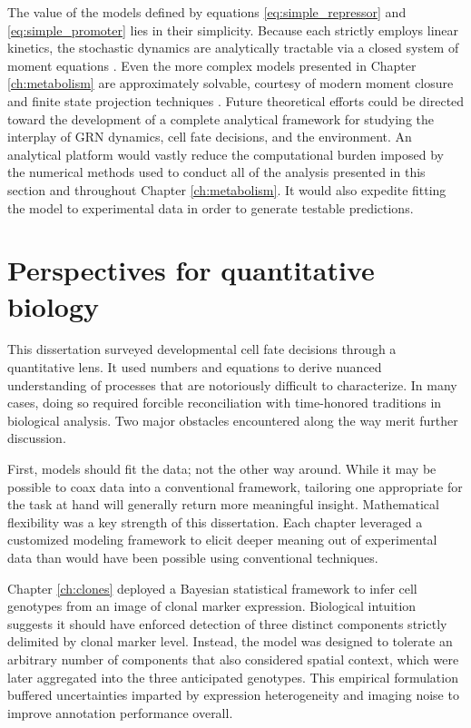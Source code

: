 The value of the models defined by equations \ref{eq:simple_repressor} and \ref{eq:simple_promoter} lies in their simplicity. Because each strictly employs linear kinetics, the stochastic dynamics are analytically tractable via a closed system of moment equations \cite{Sotiropoulos2011}. Even the more complex models presented in Chapter \ref{ch:metabolism} are approximately solvable, courtesy of modern moment closure and finite state projection techniques \cite{Singh2011,Munsky2006}. Future theoretical efforts could be directed toward the development of a complete analytical framework for studying the interplay of GRN dynamics, cell fate decisions, and the environment. An analytical platform would vastly reduce the computational burden imposed by the numerical methods used to conduct all of the analysis presented in this section and throughout Chapter \ref{ch:metabolism}. It would also expedite fitting the model to experimental data in order to generate testable predictions. 

\section{Perspectives for quantitative biology}

This dissertation surveyed developmental cell fate decisions through a quantitative lens. It used numbers and equations to derive nuanced understanding of processes that are notoriously difficult to characterize. In many cases, doing so required forcible reconciliation with time-honored traditions in biological analysis. Two major obstacles encountered along the way merit further discussion.

First, models should fit the data; not the other way around. While it may be possible to coax data into a conventional framework, tailoring one appropriate for the task at hand will generally return more meaningful insight. Mathematical flexibility was a key strength of this dissertation. Each chapter leveraged a customized modeling framework to elicit deeper meaning out of experimental data than would have been possible using conventional techniques. 

Chapter \ref{ch:clones} deployed a Bayesian statistical framework to infer cell genotypes from an image of clonal marker expression. Biological intuition suggests it should have enforced detection of three distinct components strictly delimited by clonal marker level. Instead, the model was designed to tolerate an arbitrary number of components that also considered spatial context, which were later aggregated into the three anticipated genotypes. This empirical formulation buffered uncertainties imparted by expression heterogeneity and imaging noise to improve annotation performance overall.

